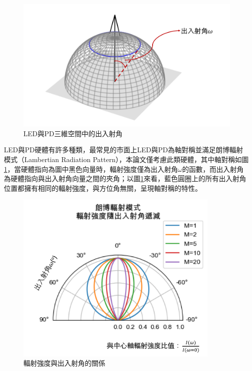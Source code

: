         \begin{figure}[htpb]
            \centering
            \includegraphics[width=12cm]{ch2pic/3d_angle.png}
            \caption{LED與PD三維空間中的出入射角}
            \label{pic:angle_3d}
        \end{figure}
        

        LED與PD硬體有許多種類，最常見的市面上LED與PD為軸對稱並滿足朗博輻射模式（Lambertian Radiation Pattern），本論文僅考慮此類硬體，其中軸對稱如圖\ref{pic:angle_3d}，當硬體指向為圖中黑色向量時，輻射強度僅為出入射角$\omega$的函數，而出入射角為硬體指向與出入射角向量之間的夾角；以圖\ref{pic:angle_3d}來看，藍色圓圈上的所有出入射角位置都擁有相同的輻射強度，與方位角無關，呈現軸對稱的特性。

        \begin{figure}[htpb]
            \centering
            \includegraphics[width=10cm]{ch2pic/lambertian.png}
            \caption{輻射強度與出入射角的關係}
            \label{pic:lambertian}
        \end{figure}

